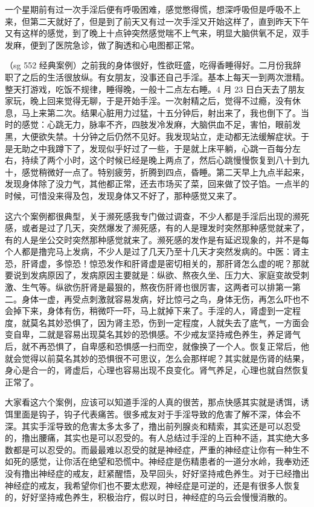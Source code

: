 \begin{case}[濒死感]
    一个星期前有过一次手淫后便有呼吸困难，感觉憋得慌，想深呼吸但是呼吸不上来，但第二天就好了，但是到了前天又有过一次手淫又开始这样了，直到昨天下午又有这样的感觉，到了晚上十点钟突然感觉喘不上气来，明显大脑供氧不足，双手发麻，便到了医院急诊，做了胸透和心电图都正常。
\end{case}

\begin{case}[濒死感]\label{sg 552}
    （sg 552 经典案例）之前我的身体很好，性欲旺盛，吃得香睡得好。二月份我辞职了之后的生活很放纵。有女朋友，没事还自己手淫。基本上每天一到两次泄精。整天打游戏，吃饭不规律，睡得晚，一般十二点左右睡。4 月 23 日白天去了朋友家玩，晚上回来觉得无聊，于是开始手淫。一次射精之后，觉得不过瘾，没有休息，马上来第二次。结果心脏用力过猛，十五分钟后，射出来了，我也倒下了。当时的感觉：心跳无力，脉率不齐，四肢发冷发麻，大脑供血不足，害怕，眼前发黑，大便欲失禁。十分钟之后仍然不见好。我发现站立，走动都无法缓解症状。于是无助之中我蹲下了，发现似乎好过了一些，于是就上床平躺，心跳一百每分左右，持续了两个小时，这个时候已经是晚上两点了，然后心跳慢慢恢复到八十到九十，感觉稍微好一点了。特别疲劳，折腾到四点，昏睡。第二天早上九点半起来，发现身体除了没力气，其他都正常，还去市场买了菜，回来做了饺子馅。一点半的时候，可惜没来得及包，发现身体又不好了，那种感觉又来了。
\end{case}

这六个案例都很典型，关于濒死感我专门做过调查，不少人都是手淫后出现的濒死感，或者是过了几天，突然爆发了濒死感，有的人是理发时突然那种感觉就来了，有的人是坐公交时突然那种感觉就来了。濒死感的发作是有延迟现象的，并不是每个人都是撸完马上发病，不少人是过了几天乃至十几天才突然发病的。中医：肾主恐，肝肾虚，多惊恐！惊恐发作和肝肾虚是密切相关的，那肝肾怎么虚的呢？那就要说到发病原因了，发病原因主要就是：纵欲、熬夜久坐、压力大、家庭变故受刺激、生气等。纵欲伤肝肾是最狠的，熬夜伤肝肾也很厉害，这两者可以排第一第二。身体一虚，再受点刺激就容易发病，好比惊弓之鸟，身体无伤，再怎么吓也不会掉下来，身体有伤，稍微吓一吓，马上就掉下来了。手淫的人，肾虚到一定程度，就莫名其妙恐惧了，因为肾主恐，伤到一定程度，人就失去了底气，一方面会变自卑，二就是容易出现莫名其妙的恐惧感。不少戒友坚持戒色养生，养足肾气后，就不再恐惧了，自卑感和恐惧感一扫而空，就像换了一个人。恢复正常后，他就会觉得以前莫名其妙的恐惧很不可思议，怎么会那样呢？其实就是伤肾的结果，身心是合一的，肾虚后，心理也容易出现不良变化。肾气养足，心理也就自然恢复正常了。

大家看这六个案例，应该可以知道手淫的人真的很苦，那点快感其实就是诱饵，诱饵里面是钩子，钩子代表痛苦。很多戒友对于手淫导致的危害了解不深，体会不深。其实手淫导致的危害太多太多了，撸出前列腺炎和精索，其实还是可以忍受的，撸出腰痛，其实也是可以忍受的。有人总结过手淫的上百种不适，其实绝大多数都是可以忍受的。而最最难以忍受的就是神经症，严重的神经症让你有一种生不如死的感觉，让你活在绝望和恐慌中。神经症是伤精患者的一道分水岭，我奉劝还没有撸出神经症的戒友，赶紧醒悟，及早回头，好好坚持戒色养生。对于已经撸出神经症的戒友，我希望你们也不要太悲观，神经症是可逆的，还是有很多人恢复的，好好坚持戒色养生，积极治疗，假以时日，神经症的乌云会慢慢消散的。

